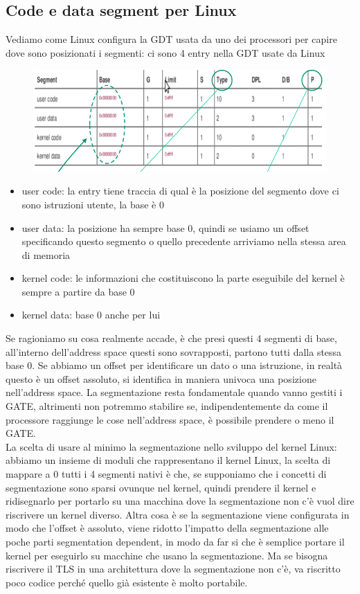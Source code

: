 \documentclass[12pt, oneside]{extbook}
\begin{document}
\subsection{Code e data segment per Linux}
Vediamo come Linux configura la GDT usata da uno dei processori per capire dove sono posizionati i segmenti: ci sono 4 entry nella GDT usate da Linux
\begin{figure}[!h]
	\includegraphics[scale=0.5]{immagini/tabella_gdt.png}
\end{figure}
\begin{itemize}
\item user code: la entry tiene traccia di qual è la posizione del segmento dove ci sono istruzioni utente, la base è 0
\item user data: la posizione ha sempre base 0, quindi se usiamo un offset specificando questo segmento o quello precedente arriviamo nella stessa area di memoria
\item kernel code: le informazioni che costituiscono la parte eseguibile del kernel è sempre a partire da base 0
\item kernel data: base 0 anche per lui
\end{itemize}
Se ragioniamo su cosa realmente accade, è che presi questi 4 segmenti di base, all'interno dell'address space questi sono sovrapposti, partono tutti dalla stessa base 0. Se abbiamo un offset per identificare un dato o una istruzione, in realtà questo è un offset assoluto, si identifica in maniera univoca una posizione nell'address space. La segmentazione resta fondamentale quando vanno gestiti i GATE, altrimenti non potremmo stabilire se, indipendentemente da come il processore raggiunge le cose nell'address space, è possibile prendere o meno il GATE.\\La scelta di usare al minimo la segmentazione nello sviluppo del kernel Linux: abbiamo un insieme di moduli che rappresentano il kernel Linux, la scelta di mappare a 0 tutti i 4 segmenti nativi è che, se supponiamo che i concetti di segmentazione sono sparsi ovunque nel kernel, quindi prendere il kernel e ridisegnarlo per portarlo su una macchina dove la segmentazione non c'è vuol dire riscrivere un kernel diverso. Altra cosa è se la segmentazione viene configurata in modo che l'offset è assoluto, viene ridotto l'impatto della segmentazione alle poche parti segmentation dependent, in modo da far si che è semplice portare il kernel per eseguirlo su macchine che usano la segmentazione. Ma se bisogna riscrivere il TLS in una architettura dove la segmentazione non c'è, va riscritto poco codice perché quello già esistente è molto portabile.
\end{document}

